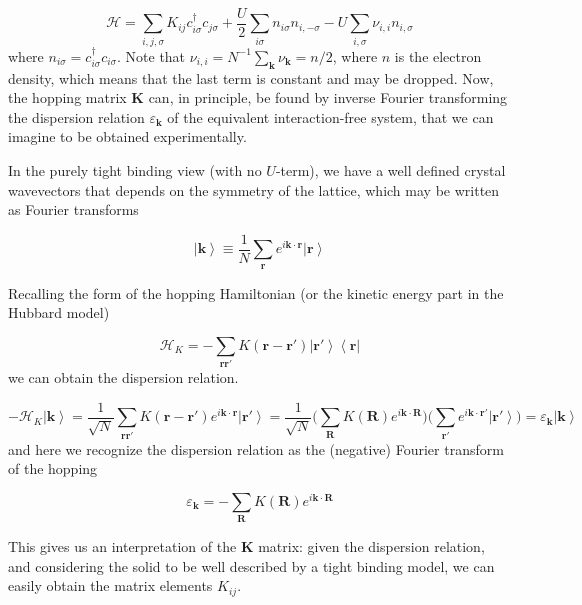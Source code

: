 \begin{equation}
\mathcal{H} = \sum_{i, j, \sigma} K_{ij} c_{i\sigma}^\dagger c_{j\sigma} + \frac{U}{2} \sum_{i\sigma} n_{i\sigma} n_{i, -\sigma} - U \sum_{i, \sigma} \nu_{i, i} n_{i, \sigma}
\end{equation}
where $n_{i\sigma} = c_{i\sigma}^\dagger c_{i\sigma}$.
Note that $\nu_{i, i} = N^{-1} \sum_{\bm k} \nu_{\bm k} = n/2$, where $n$ is the electron density, which means that the last term is constant and may be dropped.
Now, the hopping matrix $\bm K$ can, in principle, be found by inverse Fourier transforming the dispersion relation $\varepsilon_{\bm k}$ of the equivalent interaction-free system, that we can imagine to be obtained experimentally.

In the purely tight binding view (with no $U$-term), we have a well defined crystal wavevectors that depends on the symmetry of the lattice, which may be written as Fourier transforms

\begin{equation}
\left| \bm k \right\rangle \equiv \frac{1}{N} \sum_{\bm r} e^{i\bm k \cdot \bm r} \left| \bm r \right\rangle
\end{equation}

Recalling the form of the hopping Hamiltonian (or the kinetic energy part in the Hubbard model)

\begin{equation}
\mathcal{H}_{K} = - \sum_{\bm r \bm r'} K (\bm r - \bm r') \left| \bm r' \right\rangle \left\langle \bm r \right|
\end{equation}
we can obtain the dispersion relation.

\begin{equation}
- \mathcal{H}_{K} \left| \bm k \right\rangle = \frac{1}{\sqrt{N}} \sum_{\bm r \bm r'} K ( \bm r - \bm r' ) e^{i \bm k \cdot \bm r} \left| \bm r' \right \rangle = \frac{1}{\sqrt{N}} \bigg( \sum_{\bm R} K(\bm R) e^{i\bm k \cdot \bm R} \bigg) \bigg( \sum_{\bm r'} e^{i\bm k \cdot \bm r'} \left| \bm r' \right\rangle \bigg) = \varepsilon_{\bm k} \left| \bm k \right\rangle
\end{equation}
and here we recognize the dispersion relation as the (negative) Fourier transform of the hopping

\begin{equation}
\varepsilon_{\bm k} = - \sum_{\bm R} K(\bm R) e^{i\bm k \cdot \bm R} 
\end{equation}

This gives us an interpretation of the $\bm K$ matrix: given the dispersion relation, and considering the solid to be well described by a tight binding model, we can easily obtain the matrix elements $K_{i j}$.

